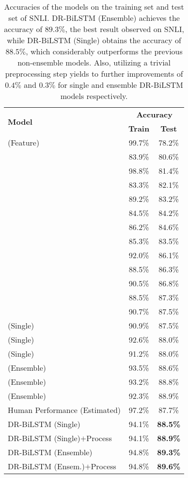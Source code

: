 \documentclass[11pt,a4paper]{article}
\begin{document}
	\begin{table}[ht]
		\begin{center}
			\small
			\begin{tabular}{lcc}
				\hline
				\multirow{2}{*}{\textbf{Model}}& \multicolumn{2}{c}{\bf{Accuracy}} \\ \cline{2-3}
				& \textbf{Train}&\textbf{Test}\\ 
				\hline \hline
				\cite{snli} (Feature)&99.7\%&78.2\%\\ 
				\hline \hline
				\cite{snli}&83.9\%&80.6\%\\ 
				\cite{Vendrov2015}&98.8\%&81.4\%\\
				\cite{Mou2016}&83.3\%&82.1\%\\
				\cite{Bowman2016}&89.2\%&83.2\%\\
				\cite{Liu2016}&84.5\%&84.2\%\\
				\cite{nse2017}&86.2\%&84.6\%\\ 
				\hline\hline
				\cite{Rocktaschel2015}&85.3\%&83.5\%\\
				\cite{Wang2016}&92.0\%&86.1\%\\
				\cite{fusion2016}&88.5\%&86.3\%\\
				\cite{google2016}&90.5\%&86.8\%\\
				\cite{nti2017}&88.5\%&87.3\%\\
				\cite{re-read}&90.7\%&87.5\%\\
				\cite{ibm2017} (Single)&90.9\%&87.5\%\\
				\cite{him2017} (Single)&92.6\%&88.0\% \\
				\cite{gong2017} (Single)&91.2\%&88.0\% \\
				\hline \hline
				\cite{him2017} (Ensemble)&93.5\%&88.6\%\\
				\cite{ibm2017} (Ensemble)&93.2\%&88.8\%\\
				\cite{gong2017} (Ensemble)&92.3\%&88.9\%\\
				\hline \hline
				Human Performance (Estimated)&97.2\%&87.7\%\\
				\hline\hline
				DR-BiLSTM (Single)&94.1\%&\textbf{88.5\%} \\
				DR-BiLSTM (Single)$+$Process&94.1\%&\textbf{88.9\%} \\
				\hline
				DR-BiLSTM (Ensemble)&94.8\%&\textbf{89.3\%} \\
				DR-BiLSTM (Ensem.)$+$Process&94.8\%&\textbf{89.6\%} \\
				\hline
			\end{tabular}
		\end{center}
		\caption{\label{tab:snli:result} Accuracies of the models on the training set and test set of SNLI. DR-BiLSTM (Ensemble) achieves the accuracy of $89.3\%$, the best result observed on SNLI, while DR-BiLSTM (Single) obtains the accuracy of $88.5\%$, which considerably outperforms the previous non-ensemble models. Also, utilizing a trivial preprocessing step yields to further improvements of $0.4\%$ and $0.3\%$ for single and ensemble DR-BiLSTM models respectively.}
	\end{table}
	
\end{document}
